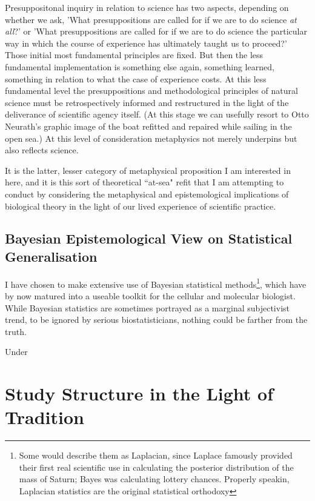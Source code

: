 \begin{longquote}
Presuppositonal inquiry in relation to science has two aspects, depending on whether we ask, 'What presuppositions are called for if we are to do science \textit{at all}?' or 'What presuppositions are called for if we are to do science the particular way in which the course of experience has ultimately taught us to proceed?' Those initial most fundamental principles are fixed. But then the less fundamental implementation is something else again, something learned, something in relation to what the case of experience costs. At this less fundamental level the presuppositions and methodological principles of natural science must be retrospectively informed and restructured in the light of the deliverance of scientific agency itself. (At this stage we can usefully resort to Otto Neurath's graphic image of the boat refitted and repaired while sailing in the open sea.) At this level of consideration metaphysics not merely underpins but also reflects science. \cite[p.5]{Rescher2000}
\end{longquote}

It is the latter, lesser category of metaphysical proposition I am interested in here, and it is this sort of theoretical ``at-sea" refit that I am attempting to conduct by considering the metaphysical and epistemological implications of biological theory in the light of our lived experience of scientific practice.

\subsection{Bayesian Epistemological View on Statistical Generalisation}
\label{sec:BayesEpistemology}
I have chosen to make extensive use of Bayesian statistical methods\footnote{Some would describe them as Laplacian, since Laplace famously provided their first real scientific use in calculating the posterior distribution of the mass of Saturn; Bayes was calculating lottery chances. Properly speakin, Laplacian statistics are the original statistical orthodoxy }, which have by now matured into a useable toolkit for the cellular and molecular biologist. While Bayesian statistics are sometimes portrayed as a marginal subjectivist trend, to be ignored by serious biostatisticians, nothing could be farther from the truth. 

Under




\section{Study Structure in the Light of Tradition}

